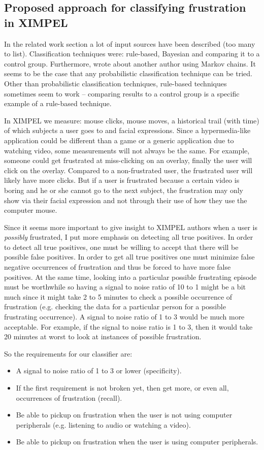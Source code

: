 \subsection{Proposed approach for classifying frustration in XIMPEL}
In the related work section a lot of input sources have been described (too many to list). Classification techniques were: rule-based, Bayesian and comparing it to a control group. Furthermore, \cite{mandryk2006} wrote about another author using Markov chains. It seems to be the case that any probabilistic classification technique can be tried. Other than probabilistic classification techniques, rule-based techniques sometimes seem to work -- comparing results to a control group is a specific example of a rule-based technique.

In XIMPEL we measure: mouse clicks, mouse moves, a historical trail (with time) of which subjects a user goes to and facial expressions. Since a hypermedia-like application could be different than a game or a generic application due to watching video, some measurements will not always be the same. For example, someone could get frustrated at miss-clicking on an overlay, finally the user will click on the overlay. Compared to a non-frustrated user, the frustrated user will likely have more clicks. But if a user is frustrated because a certain video is boring and he or she cannot go to the next subject, the frustration may only show via their facial expression and not through their use of how they use the computer mouse.

Since it seems more important to give insight to XIMPEL authors when a user is \textit{possibly} frustrated, I put more emphasis on detecting all true positives. In order to detect all true positives, one must be willing to accept that there will be possible false positives. In order to get all true positives one must minimize false negative occurrences of frustration and thus be forced to have more false positives. At the same time, looking into a particular possible frustrating episode must be worthwhile so having a signal to noise ratio of 10 to 1 might be a bit much since it might take 2 to 5 minutes to check a possible occurrence of frustration (e.g. checking the data for a particular person for a possible frustrating occurrence). A signal to noise ratio of 1 to 3 would be much more acceptable. For example, if the signal to noise ratio is 1 to 3, then it would take 20 minutes at worst to look at instances of possible frustration.

So the requirements for our classifier are:
\begin{itemize}  
    \item A signal to noise ratio of 1 to 3 or lower (specificity).
    \item If the first requirement is not broken yet, then get more, or even all, occurrences of frustration (recall).
    \item Be able to pickup on frustration when the user is not using computer peripherals (e.g. listening to audio or watching a video).
    \item Be able to pickup on frustration when the user is using computer peripherals.
\end{itemize}

